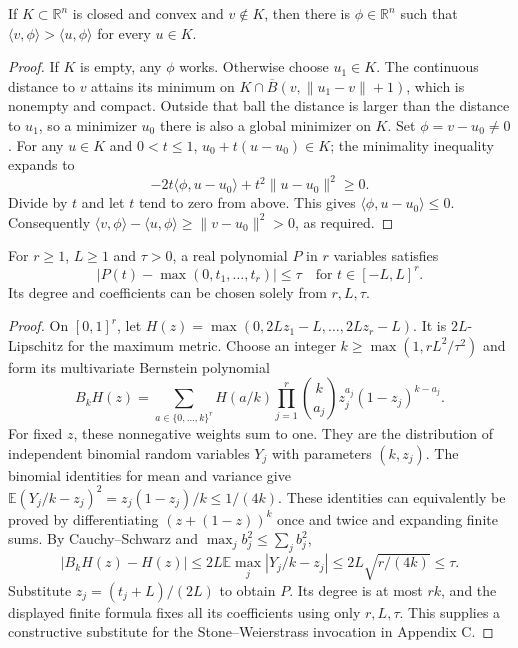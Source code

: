 \begin{lemma}
\label{app:strict-separation}
\leanok
If $K\subset\mathbb R^n$ is closed and convex and $v\notin K$, then there
is $\phi\in\mathbb R^n$ such that
$\langle v,\phi\rangle>\langle u,\phi\rangle$ for every $u\in K$.
\end{lemma}
\begin{proof}
If $K$ is empty, any $\phi$ works.  Otherwise choose $u_1\in K$.
The continuous distance to $v$ attains its minimum on
$K\cap\overline B(v,\|u_1-v\|+1)$, which is nonempty and compact.
Outside that ball the distance is larger than the distance to $u_1$, so a
minimizer $u_0$ there is also a global minimizer on $K$.
Set $\phi=v-u_0\ne0$.  For any $u\in K$ and $0<t\leq1$,
$u_0+t(u-u_0)\in K$; the minimality inequality expands to
\[
 -2t\langle\phi,u-u_0\rangle+t^2\|u-u_0\|^2\geq0.
\]
Divide by $t$ and let $t$ tend to zero from above.  This gives
$\langle\phi,u-u_0\rangle\leq0$.
Consequently $\langle v,\phi\rangle-\langle u,\phi\rangle
\geq\|v-u_0\|^2>0$, as required.
\end{proof}

\begin{lemma}
\label{app:polynomial-max}
\leanok
For $r\geq1$, $L\geq1$ and $\tau>0$, a real polynomial $P$ in $r$
variables satisfies
\[
 |P(t)-\max(0,t_1,\ldots,t_r)|\leq\tau
 \quad\text{for }t\in[-L,L]^r.
\]
Its degree and coefficients can be chosen solely from $r,L,\tau$.
\end{lemma}
\begin{proof}
On $[0,1]^r$, let $H(z)=\max(0,2Lz_1-L,\ldots,2Lz_r-L)$.
It is $2L$-Lipschitz for the maximum metric.  Choose an integer
$k\geq\max(1,rL^2/\tau^2)$ and form its multivariate Bernstein polynomial
\[
 B_kH(z)=\sum_{a\in\{0,\ldots,k\}^r}H(a/k)
     \prod_{j=1}^r\binom{k}{a_j}z_j^{a_j}(1-z_j)^{k-a_j}.
\]
For fixed $z$, these nonnegative weights sum to one.  They are the
distribution of independent binomial random variables $Y_j$ with parameters
$(k,z_j)$.  The binomial identities for mean and variance give
$\mathbb E(Y_j/k-z_j)^2=z_j(1-z_j)/k\leq1/(4k)$.
These identities can equivalently be proved by differentiating
$(z+(1-z))^k$ once and twice and expanding finite sums.
By Cauchy--Schwarz and $\max_j b_j^2\leq\sum_jb_j^2$,
\[
 |B_kH(z)-H(z)|\leq2L\mathbb E\max_j|Y_j/k-z_j|
 \leq2L\sqrt{r/(4k)}\leq\tau.
\]
Substitute $z_j=(t_j+L)/(2L)$ to obtain $P$.
Its degree is at most $rk$, and the displayed finite formula fixes all its
coefficients using only $r,L,\tau$.  This supplies a constructive substitute
for the Stone--Weierstrass invocation in Appendix C.
\end{proof}

